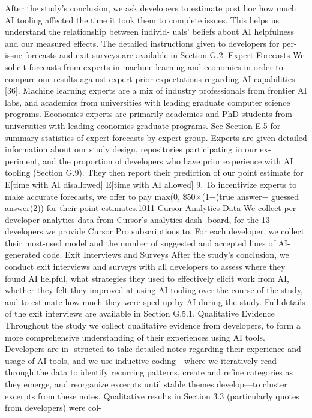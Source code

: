 After the study’s conclusion, we ask developers to estimate post hoc how much AI tooling affected
the time it took them to complete issues. This helps us understand the relationship between individ-
uals’ beliefs about AI helpfulness and our measured effects.
The detailed instructions given to developers for per-issue forecasts and exit surveys are available in
Section G.2.
Expert Forecasts
We solicit forecasts from experts in machine learning and economics in order
to compare our results against expert prior expectations regarding AI capabilities [36]. Machine
learning experts are a mix of industry professionals from frontier AI labs, and academics from
universities with leading graduate computer science programs. Economics experts are primarily
academics and PhD students from universities with leading economics graduate programs. See
Section E.5 for summary statistics of expert forecasts by expert group.
Experts are given detailed information about our study design, repositories participating in our ex-
periment, and the proportion of developers who have prior experience with AI tooling (Section G.9).
They then report their prediction of our point estimate for E[time with AI disallowed]
E[time with AI allowed]
9.
To incentivize experts to make accurate forecasts, we offer to pay max(0, \$50×(1−(true answer−
guessed answer)2)) for their point estimates.1011
Cursor Analytics Data
We collect per-developer analytics data from Cursor’s analytics dash-
board, for the 13 developers we provide Cursor Pro subscriptions to. For each developer, we collect
their most-used model and the number of suggested and accepted lines of AI-generated code.
Exit Interviews and Surveys
After the study’s conclusion, we conduct exit interviews and surveys
with all developers to assess where they found AI helpful, what strategies they used to effectively
elicit work from AI, whether they felt they improved at using AI tooling over the course of the
study, and to estimate how much they were sped up by AI during the study. Full details of the exit
interviews are available in Section G.5.1.
Qualitative Evidence
Throughout the study we collect qualitative evidence from developers, to
form a more comprehensive understanding of their experiences using AI tools. Developers are in-
structed to take detailed notes regarding their experience and usage of AI tools, and we use inductive
coding—where we iteratively read through the data to identify recurring patterns, create and refine
categories as they emerge, and reorganize excerpts until stable themes develop—to cluster excerpts
from these notes. Qualitative results in Section 3.3 (particularly quotes from developers) were col-
